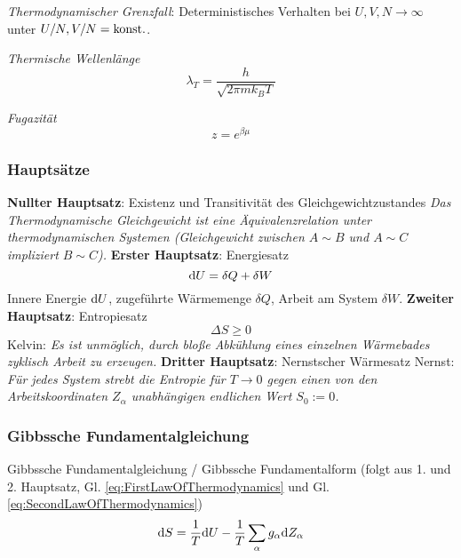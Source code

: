 \documentclass[11pt]{article}
\numberwithin{equation}{section}
\begin{document}
				\noindent
				\emph{Thermodynamischer Grenzfall}: \newline Deterministisches Verhalten bei $U,V,N\rightarrow\infty$ unter $U/N,V/N=\mathrm{konst.}$. \vsp


				\noindent
				\emph{Thermische Wellenlänge}
				\begin{equation}
					\lambda_T = \frac{h}{\sqrt{2\pi m k_B T}}
				\end{equation} \vsp

				\noindent
				\emph{Fugazität}
				\begin{equation}
					z = e^{\beta\mu}
				\end{equation} \vsp

			\subsubsection{Hauptsätze}
				\textbf{Nullter Hauptsatz}: Existenz und Transitivität des Gleichgewichtzustandes\newline
					\indent \emph{Das Thermodynamische Gleichgewicht ist eine Äquivalenzrelation unter thermodynamischen Systemen (Gleichgewicht zwischen $A \sim B$ und $A \sim C$ impliziert $ B \sim C$).} \nl
				\textbf{Erster Hauptsatz}: Energiesatz
					\begin{equation}
						\label{eq:FirstLawOfThermodynamics}
						\mathrm{d} U = \delta Q + \delta W
					\end{equation}
					\indent Innere Energie $\mathrm{d} U$, zugeführte Wärmemenge $\delta Q$, Arbeit am System $\delta W$. \nl
				\textbf{Zweiter Hauptsatz}: Entropiesatz
					\begin{equation}
						\label{eq:SecondLawOfThermodynamics}
						\Delta S	\ge 0
					\end{equation}
					\indent Kelvin: \emph{Es ist unmöglich, durch bloße Abkühlung eines einzelnen Wärmebades zyklisch Arbeit zu erzeugen. }\nl
				\textbf{Dritter Hauptsatz}: Nernstscher Wärmesatz\newline
					\indent Nernst: \emph{Für jedes System strebt die Entropie für $T \rightarrow 0$ gegen einen von den Arbeitskoordinaten $Z_\alpha$ unabhängigen endlichen Wert $S_0:=0$.}

			\subsubsection{Gibbssche Fundamentalgleichung}
				\noindent
				Gibbssche Fundamentalgleichung / Gibbssche Fundamentalform (folgt aus 1. und 2. Hauptsatz, Gl. \ref{eq:FirstLawOfThermodynamics} und Gl. \ref{eq:SecondLawOfThermodynamics})
				\begin{equation}
					\label{eq:GibbsFundamental}
					\mathrm{d} S = \frac{1}{T} \mathrm{d} U - \frac{1}{T} \sum_{\alpha} g_\alpha \mathrm{d} Z_\alpha
				\end{equation}
\end{document}
